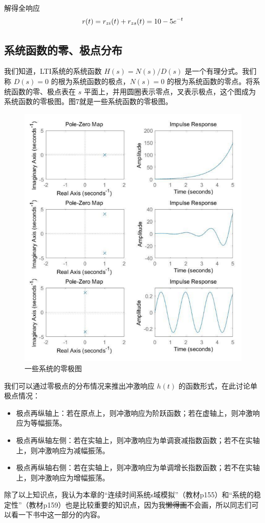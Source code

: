 \documentclass[UTF8,a4paper,11pt]{article}
\begin{document}
解得全响应
\begin{equation}
r(t)=r_{zi}(t)+r_{zs}(t)=10-5e^{-t}
\notag
\end{equation}

\subsection{系统函数的零、极点分布}
我们知道，LTI系统的系统函数 $H(s)=N(s)/D(s)$ 是一个有理分式。我们称 $D(s)=0$ 的根为系统函数的极点，$N(s)=0$ 的根为系统函数的零点。将系统函数的零、极点表在 $s$ 平面上，并用圆圈表示零点，叉表示极点，这个图成为系统函数的零极图。图7就是一些系统函数的零极图。
\begin{figure}[htbp]
\centering
\includegraphics[scale=0.9]{p7.png}
\caption{一些系统的零极图}
\end{figure}

我们可以通过零极点的分布情况来推出冲激响应 $h(t)$ 的函数形式，在此讨论单极点情况：
\begin{itemize}
\item 极点再纵轴上：若在原点上，则冲激响应为阶跃函数；若在虚轴上，则冲激响应为等幅振荡。
\item 极点再纵轴左侧：若在实轴上，则冲激响应为单调衰减指数函数；若不在实轴上，则冲激响应为减幅振荡。
\item 极点再纵轴右侧：若在实轴上，则冲激响应为单调增长指数函数；若不在实轴上，则冲激响应为增幅振荡。
\end{itemize} 

除了以上知识点，我认为本章的“连续时间系统s域模拟”（教材p155）和“系统的稳定性”（教材p159）也是比较重要的知识点，因为我\sout{懒得画}不会画，所以同志们可以看一下书中这一部分的内容。
\end{document}
